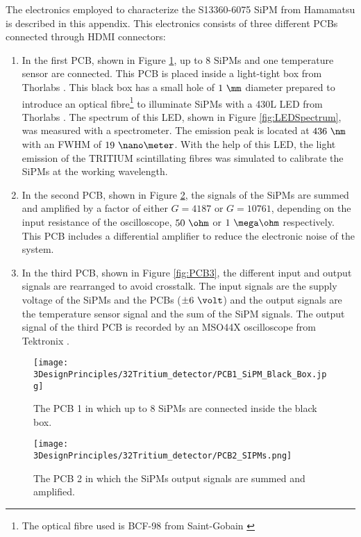The electronics employed to characterize the S13360-6075 SiPM from \newline Hamamatsu is described in this appendix. This electronics consists of three different PCBs connected through HDMI connectors:

\begin{enumerate}
\item{} In the first PCB, shown in Figure \ref{fig:PCB1}, up to 8 SiPMs and one temperature sensor are connected. This PCB is placed inside a light-tight box from Thorlabs \cite{ThorlabsCompany}. This black box has a small hole of $1~\mm$ diameter prepared to introduce an optical fibre\footnote{The optical fibre used is BCF-98 from Saint-Gobain \cite{OpticalFibers}} to illuminate SiPMs with a 430L LED from Thorlabs \cite{LEDThorlabs}. The spectrum of this LED, shown in Figure \ref{fig:LEDSpectrum}, was measured with a spectrometer. The emission peak is located at $436~\nm$ with an FWHM of $19~\nano\meter$. With the help of this LED, the light emission of the TRITIUM scintillating fibres was simulated to calibrate the SiPMs at the working wavelength. 

\item{} In the second PCB, shown in Figure \ref{fig:PCB2}, the signals of the SiPMs are summed and amplified by a factor of either $G=4187$ or $G=10761$, depending on the input resistance of the oscilloscope, $50~\ohm$ or $1~\mega\ohm$ respectively. This PCB includes a differential amplifier to reduce the electronic noise of the system.

\item{} In the third PCB, shown in Figure \ref{fig:PCB3}, the different input and output signals are rearranged to avoid crosstalk. The input signals are the supply voltage of the SiPMs and the PCBs ($\pm 6~\volt$) and the output signals are the temperature sensor signal and the sum of the SiPM signals. The output signal of the third PCB is recorded by an MSO44X oscilloscope from Tektronix \cite{Oscilloscope}.

\end{enumerate}

\begin{figure}[h]
\centering
\texttt{[image: 3DesignPrinciples/32Tritium\_detector/PCB1\_SiPM\_Black\_Box.jpg]}
\caption{The PCB 1 in which up to 8 SiPMs are connected inside the black box.\label{fig:PCB1}}
\end{figure}

\begin{figure}[h]
\centering
\texttt{[image: 3DesignPrinciples/32Tritium\_detector/PCB2\_SIPMs.png]}
\caption{The PCB 2 in which the SiPMs output signals are summed and amplified.\label{fig:PCB2}}
\end{figure}

